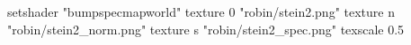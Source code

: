 setshader "bumpspecmapworld"
   texture 0 "robin/stein2.png"
   texture n "robin/stein2_norm.png"
   texture s "robin/stein2_spec.png"
texscale 0.5